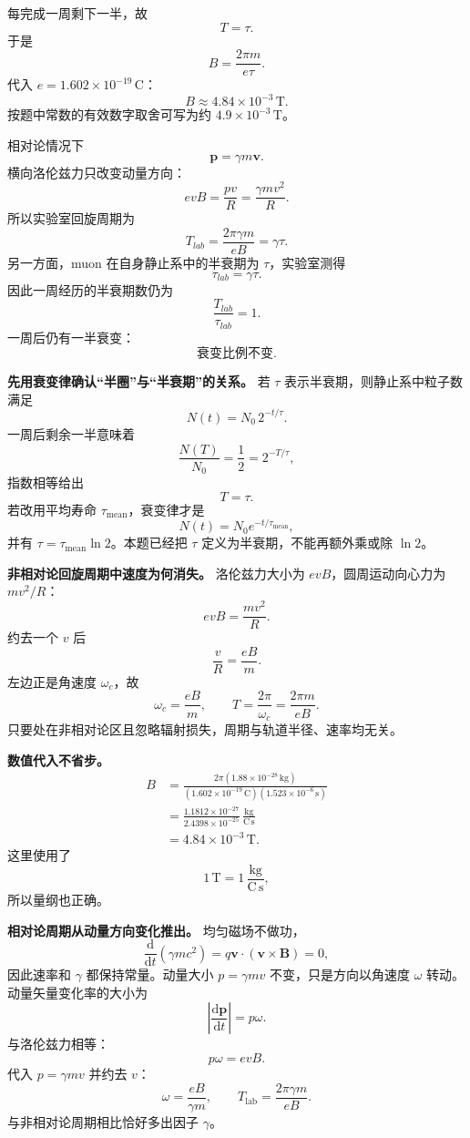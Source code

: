 \documentclass[12pt,a4paper,UTF8]{ctexart}
\begin{document}
每完成一周剩下一半，故 \[
T=\tau. \tag{4}
\] 于是 \[
B=\frac{2\pi m}{e\tau}. \tag{5}
\] 代入 \(e=1.602\times10^{-19}\,\mathrm C\)： \[
\boxed{B\approx4.84\times10^{-3}\,\mathrm T}. \tag{6}
\] 按题中常数的有效数字取舍可写为约 \(4.9\times10^{-3}\,\mathrm T\)。

相对论情况下 \[
\boldsymbol p=\gamma m\boldsymbol v. \tag{7}
\] 横向洛伦兹力只改变动量方向： \[
evB=\frac{pv}{R}
=\frac{\gamma mv^2}{R}. \tag{8}
\] 所以实验室回旋周期为 \[
T_{lab}=\frac{2\pi\gamma m}{eB}
=\gamma\tau. \tag{9}
\] 另一方面，muon 在自身静止系中的半衰期为 \(\tau\)，实验室测得 \[
\tau_{lab}=\gamma\tau. \tag{10}
\] 因此一周经历的半衰期数仍为 \[
\frac{T_{lab}}{\tau_{lab}}=1. \tag{11}
\] 一周后仍有一半衰变： \[
\boxed{\text{衰变比例不变}}. \tag{12}
\]

\textbf{先用衰变律确认``半圈''与``半衰期''的关系。} 若 \(\tau\)
表示半衰期，则静止系中粒子数满足 \[
N(t)=N_0\,2^{-t/\tau}.
\] 一周后剩余一半意味着 \[
\frac{N(T)}{N_0}=\frac12
=2^{-T/\tau},
\] 指数相等给出 \[
T=\tau.
\] 若改用平均寿命 \(\tau_{\mathrm{mean}}\)，衰变律才是 \[
N(t)=N_0e^{-t/\tau_{\mathrm{mean}}},
\] 并有 \(\tau=\tau_{\mathrm{mean}}\ln2\)。本题已经把 \(\tau\)
定义为半衰期，不能再额外乘或除 \(\ln2\)。

\textbf{非相对论回旋周期中速度为何消失。} 洛伦兹力大小为
\(evB\)，圆周运动向心力为 \(mv^2/R\)： \[
evB=\frac{mv^2}{R}.
\] 约去一个 \(v\) 后 \[
\frac vR=\frac{eB}{m}.
\] 左边正是角速度 \(\omega_c\)，故 \[
\omega_c=\frac{eB}{m},
\qquad
T=\frac{2\pi}{\omega_c}=\frac{2\pi m}{eB}.
\] 只要处在非相对论区且忽略辐射损失，周期与轨道半径、速率均无关。

\textbf{数值代入不省步。} \[
\begin{aligned}
B
&=\frac{2\pi(1.88\times10^{-28}\,\mathrm{kg})}
{(1.602\times10^{-19}\,\mathrm C)
(1.523\times10^{-6}\,\mathrm s)}\\
&=\frac{1.1812\times10^{-27}}
{2.4398\times10^{-25}}\,
\frac{\mathrm{kg}}{\mathrm{C\,s}}\\
&=4.84\times10^{-3}\,\mathrm T.
\end{aligned}
\] 这里使用了 \[
1\,\mathrm T=1\,\frac{\mathrm{kg}}{\mathrm{C\,s}},
\] 所以量纲也正确。

\textbf{相对论周期从动量方向变化推出。} 均匀磁场不做功， \[
\frac{\mathrm d}{\mathrm dt}(\gamma mc^2)
=q\boldsymbol v\cdot(\boldsymbol v\times\boldsymbol B)=0,
\] 因此速率和 \(\gamma\) 都保持常量。动量大小 \(p=\gamma mv\)
不变，只是方向以角速度 \(\omega\) 转动。动量矢量变化率的大小为 \[
\left|\frac{\mathrm d\boldsymbol p}{\mathrm dt}\right|
=p\omega.
\] 与洛伦兹力相等： \[
p\omega=evB.
\] 代入 \(p=\gamma mv\) 并约去 \(v\)： \[
\omega=\frac{eB}{\gamma m},
\qquad
T_{\mathrm{lab}}=\frac{2\pi\gamma m}{eB}.
\] 与非相对论周期相比恰好多出因子 \(\gamma\)。
\end{document}
